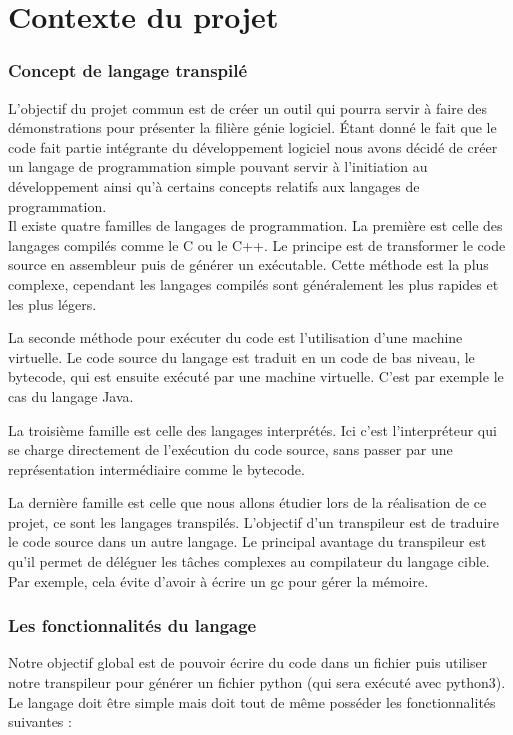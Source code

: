 \documentclass[a4paper]{article}%
\begin{document}
\part{Contexte du projet}

\section{Concept de langage transpilé}

L'objectif du projet commun est de créer un outil qui pourra servir à faire des
démonstrations pour présenter la filière génie logiciel. Étant donné le fait que
le code fait partie intégrante du développement logiciel nous avons décidé de
créer un langage de programmation simple pouvant servir à l'initiation au
développement ainsi qu'à certains concepts relatifs aux langages de
programmation.\\

Il existe quatre familles de langages de programmation. La première est celle
des langages compilés comme le C ou le C++. Le principe est de transformer le
code source en assembleur puis de générer un exécutable. Cette méthode est la
plus complexe, cependant les langages compilés sont généralement les plus
rapides et les plus légers.

La seconde méthode pour exécuter du code est l'utilisation d'une machine
virtuelle. Le code source du langage est traduit en un code de bas niveau, le
\gls{bytecode}, qui est ensuite exécuté par une machine virtuelle. C'est par
exemple le cas du langage Java.

La troisième famille est celle des langages interprétés. Ici c'est
l'interpréteur qui se charge directement de l'exécution du code source, sans
passer par une représentation intermédiaire comme le bytecode.

La dernière famille est celle que nous allons étudier lors de la réalisation de
ce projet, ce sont les langages transpilés. L'objectif d'un transpileur est de
traduire le code source dans un autre langage. Le principal avantage du
transpileur est qu'il permet de déléguer les tâches complexes au compilateur du
langage cible. Par exemple, cela évite d'avoir à écrire un \gls{gc} pour gérer
la mémoire.

\section{Les fonctionnalités du langage}

Notre objectif global est de pouvoir écrire du code dans un fichier puis
utiliser notre transpileur pour générer un fichier python (qui sera exécuté avec
python3). Le langage doit être simple mais doit tout de même posséder les
fonctionnalités suivantes :
\end{document}
